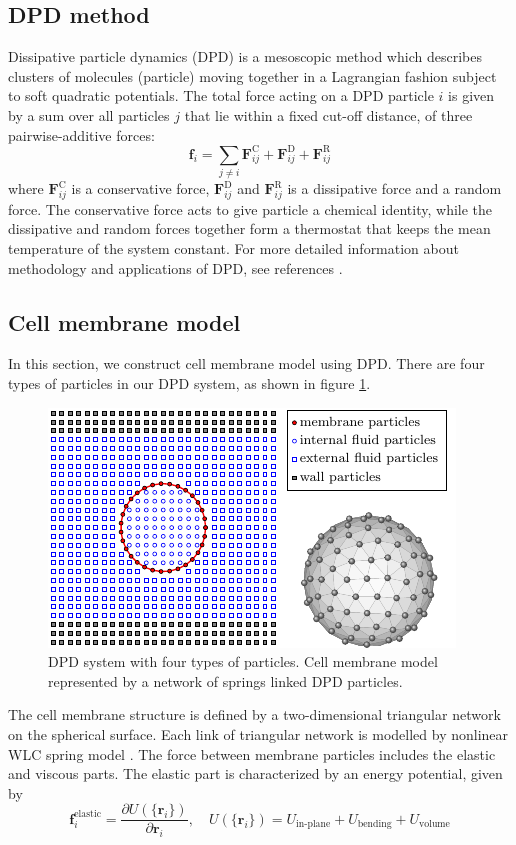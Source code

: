 \documentclass[review]{elsarticle}
\begin{document}
\subsection{DPD method}
Dissipative particle dynamics (DPD) \cite{hoogerbrugge_simulating_1992} is a mesoscopic method which describes clusters of molecules (particle) moving together in a Lagrangian fashion subject to soft quadratic potentials. The total force acting on a DPD particle $i$ is given by a sum over all particles $j$ that lie within a fixed cut-off distance, of three pairwise-additive forces:
\begin{equation}\label{Forcesum}
\mathbf{f}_{i}  = \sum_{j\neq i} \mathbf{F}_{ij}^\mathrm{C} + \mathbf{F}_{ij}^\mathrm{D} + \mathbf{F}_{ij}^\mathrm{R}
\end{equation}
where $\mathbf{F}_{ij}^\mathrm{C}$ is a conservative force, $\mathbf{F}_{ij}^\mathrm{D}$ and $\mathbf{F}_{ij}^\mathrm{R}$ is a dissipative force and a random force. The conservative force acts to give particle a chemical identity, while the dissipative and random forces together form a thermostat that keeps the mean temperature of the system constant. For more detailed information about methodology and applications of DPD, see references \cite{hoogerbrugge_simulating_1992,liu_dissipative_2014}.

\subsection{Cell membrane model}
In this section, we construct cell membrane model using DPD. There are four types of particles in our DPD system,  as shown in figure \ref{fig:4particles}. 
\begin{figure}[!htb]
\centering
\includegraphics{4typeparticles.pdf}
\caption{DPD system with four types of particles. Cell membrane model represented by a network of springs linked DPD particles.}\label{fig:4particles}
\end{figure}
The cell membrane structure is defined by a two-dimensional triangular network on the spherical surface. Each link of triangular network is modelled by nonlinear WLC spring model \cite{marko_stretching_1995}. The force between membrane particles includes the elastic and viscous parts. The elastic part is characterized by an energy potential, given by
\begin{equation}\label{eq:free_energy}
\mathbf{f}_i^\textrm{elastic} = \frac{\partial U(\{\mathbf{r}_i\})}{\partial \mathbf{r}_i}, \quad U(\{\mathbf{r}_i\}) = U_{\textrm{in-plane}} + U_{\mathrm{bending}} + U_{\mathrm{volume}}
\end{equation}
\end{document}
